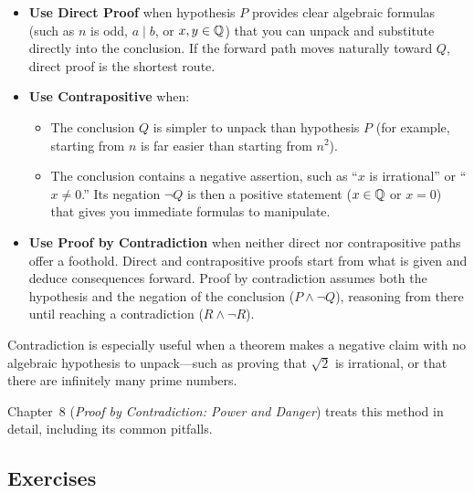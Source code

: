 \begin{itemize}
\item \textbf{Use Direct Proof} when hypothesis $P$ provides clear algebraic formulas (such as $n$ is odd, $a \mid b$, or $x, y \in \mathbb{Q}$) that you can unpack and substitute directly into the conclusion. If the forward path moves naturally toward $Q$, direct proof is the shortest route.
\item \textbf{Use Contrapositive} when:
\begin{itemize}
\item The conclusion $Q$ is simpler to unpack than hypothesis $P$ (for example, starting from $n$ is far easier than starting from $n^2$).
\item The conclusion contains a negative assertion, such as ``$x$ is irrational'' or ``$x \neq 0$.'' Its negation $\neg Q$ is then a positive statement ($x \in \mathbb{Q}$ or $x = 0$) that gives you immediate formulas to manipulate.
\end{itemize}
\item \textbf{Use Proof by Contradiction} when neither direct nor contrapositive paths offer a foothold. Direct and contrapositive proofs start from what is given and deduce consequences forward. Proof by contradiction assumes both the hypothesis and the negation of the conclusion ($P \land \neg Q$), reasoning from there until reaching a contradiction ($R \land \neg R$).
\end{itemize}

Contradiction is especially useful when a theorem makes a negative claim with no algebraic hypothesis to unpack---such as proving that $\sqrt{2}$ is irrational, or that there are infinitely many prime numbers.

Chapter~8 (\emph{Proof by Contradiction: Power and Danger}) treats this method in detail, including its common pitfalls.

\subsection{Exercises}

